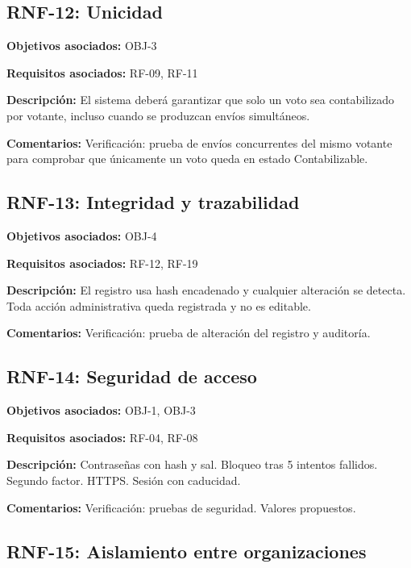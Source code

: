 \subsection{RNF-12: Unicidad}

\textbf{Objetivos asociados:} OBJ-3\par
\textbf{Requisitos asociados:} RF-09, RF-11\par
\textbf{Descripción:} El sistema deberá garantizar que solo un voto sea contabilizado por votante, incluso cuando se produzcan envíos simultáneos.\par
\textbf{Comentarios:} Verificación: prueba de envíos concurrentes del mismo votante para comprobar que únicamente un voto queda en estado Contabilizable.\par

\subsection{RNF-13: Integridad y trazabilidad}

\textbf{Objetivos asociados:} OBJ-4\par
\textbf{Requisitos asociados:} RF-12, RF-19\par
\textbf{Descripción:} El registro usa hash encadenado y cualquier alteración se detecta. Toda acción administrativa queda registrada y no es editable.\par
\textbf{Comentarios:} Verificación: prueba de alteración del registro y auditoría.\par

\subsection{RNF-14: Seguridad de acceso}

\textbf{Objetivos asociados:} OBJ-1, OBJ-3\par
\textbf{Requisitos asociados:} RF-04, RF-08\par
\textbf{Descripción:} Contraseñas con hash y sal. Bloqueo tras 5 intentos fallidos. Segundo factor. HTTPS. Sesión con caducidad.\par
\textbf{Comentarios:} Verificación: pruebas de seguridad. Valores propuestos.\par

\subsection{RNF-15: Aislamiento entre organizaciones}


